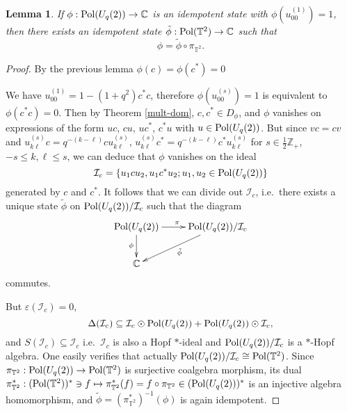 \documentclass[12pt]{amsart}
\newtheorem{lemma}[theorem]{Lemma}
\theoremstyle{definition}
\theoremstyle{remark}
\numberwithin{equation}{section}
\begin{document}
\begin{lemma}\label{lem-torus}
If $\phi:{\rm Pol} (U_q(2))\to\mathbb{C}$ is an idempotent state with
$\phi(u^{(1)}_{00})=1$, then there exists an idempotent state
$\tilde{\phi}:{\rm Pol}(\mathbb{T}^2)\to\mathbb{C}$ such that
\[
\phi = \tilde{\phi}\circ \pi_{\mathbb{T}^2}.
\]
\end{lemma}
\begin{proof}
By the previous lemma $\phi(c)=\phi(c^*)=0$

We have  $u^{(1)}_{00}=1-(1+q^2) c^*c$, therefore
$\phi(u^{(s)}_{00})=1$ is equivalent to $\phi(c^*c)=0$. Then by
Theorem  \ref{mult-dom}, $c,c^*\in D_\phi$, and $\phi$ vanishes on expressions of the form $uc$, $c u$, $uc^*$, $c^* u$ with $u\in {\rm Pol}(U_q(2))$. But since $vc =c v$ and $u^{(s)}_{k\ell}c = q^{-(k-\ell)}c u^{(s)}_{k\ell}$, $u^{(s)}_{k\ell}c^* = q^{-(k-\ell)}c^* u^{(s)}_{k\ell}$ for $s\in\frac{1}{2}\mathbb{Z}_+$, $-s\le k,\ell\le s$, we can deduce that $\phi$ vanishes on the ideal
\[
\mathcal{I}_c = \{ u_1c u_2,u_1c^* u_2 ; u_1,u_2\in {\rm
  Pol}(U_q(2))\}
\]
generated by $c$ and $c^*$. It follows that we can divide
out $\mathcal{I}_c$, i.e.\ there exists a unique state $\tilde{\phi}$ on
${\rm Pol}(U_q(2))/ \mathcal{I}_c$ such that the diagram
\[
\xymatrix{
{\rm Pol}(U_q(2))\ar[r]^\pi \ar[d]_\phi & {\rm Pol}(U_q(2))/ \mathcal{I}_c \ar[dl]^{\tilde{\phi}} \\
\mathbb{C}
}
\]
commutes.

But $\varepsilon(\mathcal{I}_c)=0$,
\[
\Delta(\mathcal{I}_c) \subseteq \mathcal{I}_c\odot{\rm
  Pol}(U_q(2))+{\rm Pol}(U_q(2)) \odot \mathcal{I}_c,
\]
and $S(\mathcal{I}_c)\subseteq \mathcal{I}_c$
i.e.\ $\mathcal{I}_c$ is also a Hopf $*$-ideal and ${\rm Pol}(U_q(2))/
\mathcal{I}_c$ is a $*$-Hopf algebra. One easily verifies that actually
${\rm Pol}(U_q(2))/ \mathcal{I}_c\cong {\rm Pol}(\mathbb{T}^2)$. Since
$\pi_{\mathbb{T}^2}:{\rm Pol}(U_q(2))\to {\rm Pol}(\mathbb{T}^2)$ is
surjective coalgebra
morphism, its dual $\pi_{\mathbb{T}^2}^*:({\rm Pol}(\mathbb{T}^2))^*\ni
f\mapsto \pi_{\mathbb{T}^2}^*(f)=f\circ\pi_{\mathbb{T}^2}\in ({\rm
  Pol}(U_q(2)))^*$ is an injective algebra homomorphism, and
$\tilde{\phi}=(\pi_{\mathbb{T}^2}^*)^{-1}(\phi)$ is again idempotent.
\end{proof}
\end{document}
